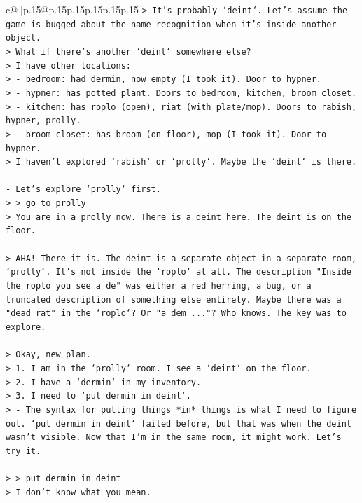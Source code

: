 \documentclass{article}
\begin{document}
{\begin{supertabular}{c@{$\;$}|p{.15\linewidth}@{}p{.15\linewidth}p{.15\linewidth}p{.15\linewidth}p{.15\linewidth}p{.15\linewidth}}
{{{\texttt{> It's probably `deint`. Let's assume the game is bugged about the name recognition when it's inside another object.} \\
\texttt{> What if there's another `deint` somewhere else?} \\
\texttt{> I have other locations:} \\
\texttt{> {-} bedroom: had dermin, now empty (I took it). Door to hypner.} \\
\texttt{> {-} hypner: has potted plant. Doors to bedroom, kitchen, broom closet.} \\
\texttt{> {-} kitchen: has roplo (open), riat (with plate/mop). Doors to rabish, hypner, prolly.} \\
\texttt{> {-} broom closet: has broom (on floor), mop (I took it). Door to hypner.} \\
\texttt{> I haven't explored `rabish` or `prolly`. Maybe the `deint` is there.} \\
\\ 
\texttt{{-} Let's explore `prolly` first.} \\
\texttt{> > go to prolly} \\
\texttt{> You are in a prolly now. There is a deint here. The deint is on the floor.} \\
\\ 
\texttt{> AHA! There it is. The deint is a separate object in a separate room, `prolly`. It's not inside the `roplo` at all. The description "Inside the roplo you see a de" was either a red herring, a bug, or a truncated description of something else entirely. Maybe there was a "dead rat" in the `roplo`? Or "a dem ..."? Who knows. The key was to explore.} \\
\\ 
\texttt{> Okay, new plan.} \\
\texttt{> 1. I am in the `prolly` room. I see a `deint` on the floor.} \\
\texttt{> 2. I have a `dermin` in my inventory.} \\
\texttt{> 3. I need to `put dermin in deint`.} \\
\texttt{>   {-} The syntax for putting things *in* things is what I need to figure out. `put dermin in deint` failed before, but that was when the deint wasn't visible. Now that I'm in the same room, it might work. Let's try it.} \\
\\ 
\texttt{> > put dermin in deint} \\
\texttt{> I don't know what you mean.} \\
}}}
\end{supertabular}}
\end{document}
